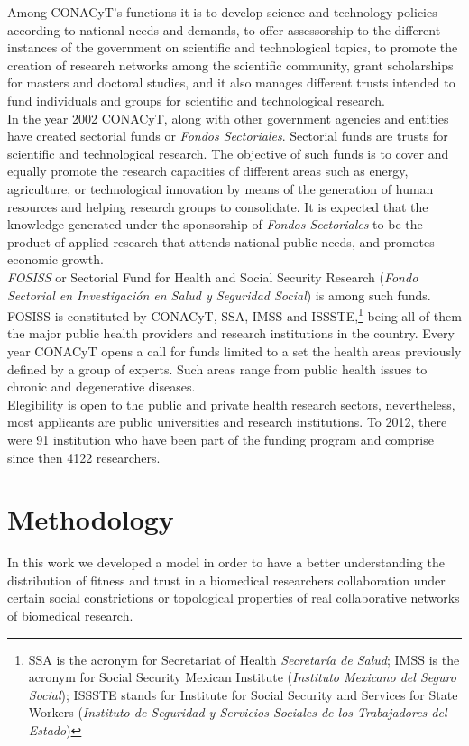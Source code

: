 Among CONACyT's functions it is to develop science and technology
policies according to national needs and demands, to offer
assessorship to the different instances of the government on
scientific and technological topics, to promote the creation of
research networks among the scientific community, grant scholarships
for masters and doctoral studies, and it also manages different trusts
intended to fund individuals and groups for scientific and
technological research.\\

In the year 2002 CONACyT, along with other government agencies and
entities have created sectorial funds or \emph{Fondos Sectoriales}.
Sectorial funds are trusts for scientific and technological research.
The objective of such funds is to cover and equally promote the
research capacities of different areas such as energy, agriculture, or
technological innovation by means of the generation of human resources
and helping research groups to consolidate. It is expected that the
knowledge generated under the sponsorship of \emph{Fondos Sectoriales}
to be the product of applied research that attends national public
needs, and promotes economic growth.\\

\emph{FOSISS} or Sectorial Fund for Health and Social Security
Research (\emph{Fondo Sectorial en Investigaci\'on en Salud y
  Seguridad Social}) is among such funds. FOSISS is constituted by
CONACyT, SSA, IMSS and ISSSTE,\footnote{SSA is the acronym for
  Secretariat of Health \emph{Secretar\'ia de Salud}; IMSS is the
  acronym for Social Security Mexican Institute (\emph{Instituto
    Mexicano del Seguro Social}); ISSSTE stands for Institute for
  Social Security and Services for State Workers (\emph{Instituto de
    Seguridad y Servicios Sociales de los Trabajadores del Estado})}
being all of them the major public health providers and research
institutions in the country. Every year CONACyT opens a call for funds
limited to a set the health areas previously defined by a group of
experts. Such areas range from public health issues to chronic and
degenerative diseases.\\

Elegibility is open to the public and private health research
sectors, nevertheless, most applicants are public universities and
research institutions. To 2012, there were 91 institution who have
been part of the funding program and comprise since then 4122
researchers.

\section{Methodology}
\label{sec:2}
In this work we developed a model in order to have a better
understanding the distribution of fitness and trust in a biomedical
researchers collaboration under certain social constrictions or
topological properties of real collaborative networks of biomedical
research.\\

